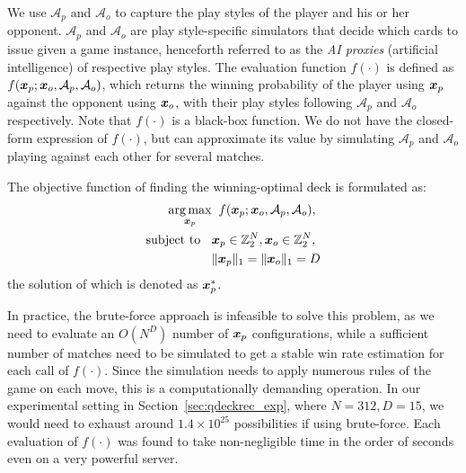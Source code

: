 We use $\mathcal{A}_p$ and $\mathcal{A}_o$ to capture the play styles of the player and his or her opponent. $\mathcal{A}_p$ and $\mathcal{A}_o$ are play style-specific simulators that decide which cards to issue given a game instance, henceforth referred to as the \textit{AI proxies} (artificial intelligence) of respective play styles. The evaluation function $f(\cdot)$ is defined as $f(\boldsymbol{x}_p; \boldsymbol{x}_o, \mathcal{A}_p, \mathcal{A}_o)$, which returns the winning probability of the player using $\boldsymbol{x}_p$ against the opponent using $\boldsymbol{x}_o$, with their play styles following $\mathcal{A}_p$ and $\mathcal{A}_o$ respectively. Note that $f(\cdot)$ is a black-box function. We do not have the closed-form expression of $f(\cdot)$, but can approximate its value by simulating $\mathcal{A}_p$ and $\mathcal{A}_o$ playing against each other for several matches.

The objective function of finding the winning-optimal deck is formulated as:
\begin{align}
\begin{split}
\operatorname*{arg\,max}_{\boldsymbol{x}_p} & \;\; f(\boldsymbol{x}_p; \boldsymbol{x}_o, \mathcal{A}_p, \mathcal{A}_o), \\
\text{subject to } \;\;&\boldsymbol{x}_p \in \mathbb{Z}_2^N, \boldsymbol{x}_o \in \mathbb{Z}_2^N, \\
&\|\boldsymbol{x}_p\|_1=\|\boldsymbol{x}_o\|_1=D
\end{split}
\label{eqn:obj}
\end{align}
the solution of which is denoted as $\boldsymbol{x}_p^*$.

In practice, the brute-force approach is infeasible to solve this problem, as we need to evaluate an $O(N^D)$ number of $\boldsymbol{x}_p$ configurations, while a sufficient number of matches need to be simulated to get a stable win rate estimation for each call of $f(\cdot)$. Since the simulation needs to apply numerous rules of the game on each move, this is a computationally demanding operation. In our experimental setting in Section~\ref{sec:qdeckrec_exp}, where $N=312, D=15$, we would need to exhaust around $1.4 \times 10^{25}$ possibilities if using brute-force. Each evaluation of $f(\cdot)$ was found to take non-negligible time in the order of seconds even on a very powerful server.   




